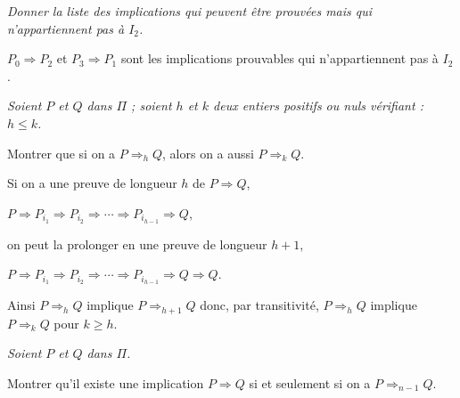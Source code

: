 \begin{Exercise}\it
Donner la liste des implications qui peuvent être prouvées mais qui n'appartiennent pas à $I_2$.
\end{Exercise}
\begin{Answer}
$P_0\Rightarrow P_2$ et $P_3\Rightarrow P_1$ sont les implications prouvables qui n'appartiennent pas à $I_2$.
\end{Answer}
\begin{Exercise}\it
Soient $P$ et $Q$ dans $\Pi$ ; soient $h$ et $k$ deux entiers positifs ou nuls vérifiant : $h \le  k$. 

Montrer que si on a $P \Rightarrow_{h} Q$, alors on a aussi $P \Rightarrow_k Q$.
\end{Exercise}
\begin{Answer}Si on a une preuve de longueur $h$ de $P\Rightarrow Q$,

$P \Rightarrow P_{i_1} \Rightarrow P_{i_2} \Rightarrow \cdots \Rightarrow P_{i_{h-1}} \Rightarrow Q$,

on peut la prolonger en une preuve de longueur $h+1$,

$P \Rightarrow P_{i_1} \Rightarrow P_{i_2} \Rightarrow \cdots \Rightarrow P_{i_{h-1}} \Rightarrow Q \Rightarrow Q$.

Ainsi $P \Rightarrow_{h} Q$ implique $P \Rightarrow_{h+1} Q$ donc, par transitivité, $P \Rightarrow_{h} Q$ implique $P \Rightarrow_{k} Q$ pour $k\ge h$.
\end{Answer}
\begin{Exercise}\it
Soient $P$ et $Q$ dans $\Pi$. 

Montrer qu'il existe une implication $P \Rightarrow Q$ si et seulement si on a $P \Rightarrow_{n - 1} Q$. 
\end{Exercise}
